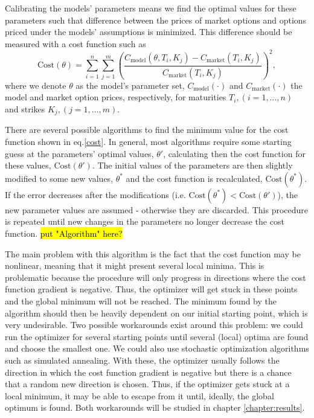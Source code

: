 Calibrating the models' parameters means we find the optimal values for these parameters such that difference between the prices of market options and options priced under the models' assumptions is minimized. This difference should be measured with a cost function such as
\begin{equation}\label{cost}
\mathrm{Cost}(\theta)=\sum_{i=1}^n\sum_{j=1}^m\left(\frac{C_{\mathrm{model}}(\theta,T_i,K_j)-C_{\mathrm{market}}(T_i,K_j)}{C_{\mathrm{market}}(T_i,K_j)}\right)^2,
\end{equation}
\noindent where we denote $\theta$ as the model's parameter set, $C_{\mathrm{model}}(\cdot)$ and $C_{\mathrm{market}}(\cdot)$ the model and market option prices, respectively, for maturities $T_i,(i=1,\ldots,n)$ and strikes $K_j,(j=1,\ldots,m)$.


There are several possible algorithms to find the minimum value for the cost function shown in eq.\eqref{cost}. In general, most algorithms require some starting guess at the parameters' optimal values, $\theta'$, calculating then the cost function for these values, $\mathrm{Cost}(\theta')$. The initial values of the parameters are then slightly modified to some new values, $\theta^{*}$ and the cost function is recalculated, $\mathrm{Cost}(\theta^{*})$. If the error decreases after the modifications (i.e. $\mathrm{Cost}(\theta^{*})<\mathrm{Cost}(\theta')$), the new parameter values are assumed - otherwise they are discarded. This procedure is repeated until new changes in the parameters no longer decrease the cost function.
\hl{put "Algorithm" here?}

The main problem with this algorithm is the fact that the cost function may be nonlinear, meaning that it might present several local minima. This is problematic because the procedure will only progress in directions where the cost function gradient is negative. Thus, the optimizer will get stuck in these points and the global minimum will not be reached.
The minimum found by the algorithm should then be heavily dependent on our initial starting point, which is very undesirable.
Two possible workarounds exist around this problem: we could run the optimizer for several starting points until several (local) optima are found and choose the smallest one. We could also use stochastic optimization algorithms such as simulated annealing. With these, the optimizer usually follows the direction in which the cost function gradient is negative but there is a chance that a random new direction is chosen. Thus, if the optimizer gets stuck at a local minimum, it may be able to escape from it until, ideally, the global optimum is found.
Both workarounds will be studied in chapter \ref{chapter:results}.



